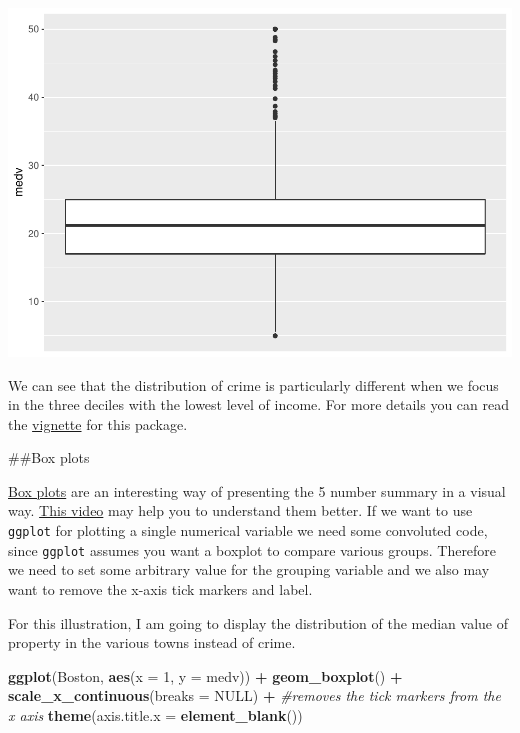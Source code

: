 \documentclass[]{book}
\newenvironment{Shaded}{\begin{snugshade}}{\end{snugshade}}
\newcommand{\CommentTok}[1]{\textcolor[rgb]{0.56,0.35,0.01}{\textit{#1}}}
\newcommand{\DataTypeTok}[1]{\textcolor[rgb]{0.13,0.29,0.53}{#1}}
\newcommand{\DecValTok}[1]{\textcolor[rgb]{0.00,0.00,0.81}{#1}}
\newcommand{\KeywordTok}[1]{\textcolor[rgb]{0.13,0.29,0.53}{\textbf{#1}}}
\newcommand{\NormalTok}[1]{#1}
\newcommand{\OperatorTok}[1]{\textcolor[rgb]{0.81,0.36,0.00}{\textbf{#1}}}
\newcommand{\OtherTok}[1]{\textcolor[rgb]{0.56,0.35,0.01}{#1}}
\newcommand{\StringTok}[1]{\textcolor[rgb]{0.31,0.60,0.02}{#1}}
\theoremstyle{definition}
\theoremstyle{definition}
\theoremstyle{definition}
\theoremstyle{remark}
\begin{document}
\includegraphics{03-visualisation_files/figure-latex/unnamed-chunk-29-1.pdf}

We can see that the distribution of crime is particularly different when
we focus in the three deciles with the lowest level of income. For more
details you can read the
\href{https://cran.r-project.org/web/packages/ggridges/vignettes/introduction.html}{vignette}
for this package.

\#\#Box plots

\href{http://tomhopper.me/2014/07/04/the-most-useful-data-plot-youve-never-used/}{Box
plots} are an interesting way of presenting the 5 number summary in a
visual way.
\href{http://www.learner.org/courses/againstallodds/unitpages/unit05.html}{This
video} may help you to understand them better. If we want to use
\texttt{ggplot} for plotting a single numerical variable we need some
convoluted code, since \texttt{ggplot} assumes you want a boxplot to
compare various groups. Therefore we need to set some arbitrary value
for the grouping variable and we also may want to remove the x-axis tick
markers and label.

For this illustration, I am going to display the distribution of the
median value of property in the various towns instead of crime.

\begin{Shaded}
\begin{Highlighting}[]
\KeywordTok{ggplot}\NormalTok{(Boston, }\KeywordTok{aes}\NormalTok{(}\DataTypeTok{x =} \DecValTok{1}\NormalTok{, }\DataTypeTok{y =}\NormalTok{ medv)) }\OperatorTok{+}\StringTok{ }
\StringTok{  }\KeywordTok{geom_boxplot}\NormalTok{() }\OperatorTok{+}
\StringTok{  }\KeywordTok{scale_x_continuous}\NormalTok{(}\DataTypeTok{breaks =} \OtherTok{NULL}\NormalTok{) }\OperatorTok{+}\StringTok{ }\CommentTok{#removes the tick markers from the x axis}
\StringTok{  }\KeywordTok{theme}\NormalTok{(}\DataTypeTok{axis.title.x =} \KeywordTok{element_blank}\NormalTok{())}
\end{Highlighting}
\end{Shaded}
\end{document}
